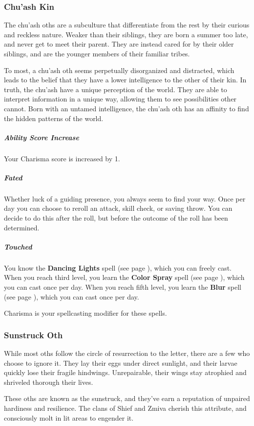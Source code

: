 \subsubsection{Chu'ash Kin}
    The chu'ash oths are a subculture that differentiate from the rest by their curious and reckless nature.
    Weaker than their siblings, they are born a summer too late, and never get to meet their parent.
    They are instead cared for by their older siblings, and are the younger members of their familiar tribes.

    To most, a chu'ash oth seems perpetually disorganized and distracted, which leads to the belief that they have a lower intelligence to the other of their kin.
    In truth, the chu'ash have a unique perception of the world.
    They are able to interpret information in a unique way, allowing them to see possibilities other cannot.
    Born with an untamed intelligence, the chu'ash oth has an affinity to find the hidden patterns of the world.

    \subparagraph{Ability Score Increase} Your Charisma score is increased by 1.

    \subparagraph{Fated} Whether luck of a guiding presence, you always seem to find your way.
    Once per day you can choose to reroll an attack, skill check, or saving throw.
    You can decide to do this after the roll, but before the outcome of the roll has been determined.

    \subparagraph{Touched} You know the \textbf{Dancing Lights} spell (see page \pageref{spell:dancinglights}), which you can freely cast.
    When you reach third level, you learn the \textbf{Color Spray} spell (see page \pageref{spell:colorspray}), which you can cast once per day.
    When you reach fifth level, you learn the \textbf{Blur} spell (see page \pageref{spell:blur}), which you can cast once per day.

    Charisma is your spellcasting modifier for these spells.

\subsubsection{Sunstruck Oth}
    While most oths follow the circle of resurrection to the letter, there are a few who choose to ignore it.
    They lay their eggs under direct sunlight, and their larvae quickly lose their fragile hindwings.
    Unrepairable, their wings stay atrophied and shriveled thorough their lives.

    These oths are known as the sunstruck, and they've earn a reputation of unpaired hardiness and resilience.
    The clans of Shief and Zmiva cherish this attribute, and consciously molt in lit areas to engender it.

